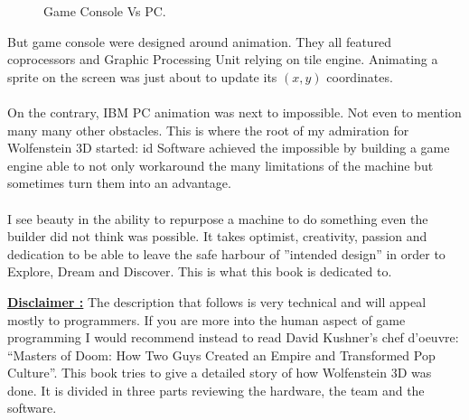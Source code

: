 \begin{figure}[H]
\centering
   \caption{Game Console Vs PC.} \label{fig:game_console_vs_PC}
 \end{figure}
 
But game console were designed around animation. They all featured coprocessors and Graphic Processing Unit relying on tile engine. Animating a sprite on the screen was just about to update its $(x,y)$ coordinates.\\
\\
On the contrary, IBM PC animation was next to impossible. Not even to mention many many other obstacles. This is where the root of my admiration for Wolfenstein 3D started: id Software achieved the impossible by building a game engine able to not only workaround the many limitations of the machine but sometimes turn them into an advantage.\\
\\
I see beauty in the ability to repurpose a machine to do something even the builder did not think was possible. It takes optimist, creativity, passion and dedication to be able to leave the safe harbour of ''intended design'' in order to Explore, Dream and Discover. This is what this book is dedicated to.\\
\bigskip

 \textbf{\underline{Disclaimer :}} The description that follows is very technical and will appeal mostly to programmers. If you are more into the human aspect of game programming I would recommend instead to read David Kushner’s chef d’oeuvre: “Masters of Doom: How Two Guys Created an Empire and Transformed Pop Culture”.
This book tries to give a detailed story of how Wolfenstein 3D was done. It is divided in three parts reviewing the hardware, the team and the software.